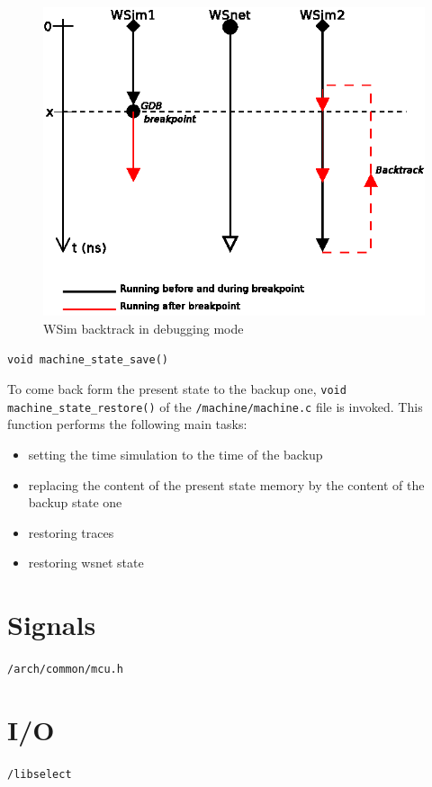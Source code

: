\documentclass[a4paper,10pt]{report}
\begin{document}
\begin{figure}
\begin{center}
  \includegraphics[scale=1]{figures/wsim_backtrack2.eps}
\end{center}
\caption{WSim backtrack in debugging mode}
\label{wsim backtrack 2}
\end{figure}

\verb$void machine_state_save()$

To come back form the present state to the backup one, \verb$void machine_state_restore()$ of the \verb$/machine/machine.c$ file is invoked. This function performs the following main tasks:
\begin{itemize}
  \item setting the time simulation to the time of the backup
  \item replacing the content of the present state memory by the content of the backup state one
  \item restoring traces
  \item restoring wsnet state
\end{itemize}

\section{Signals}
\verb$/arch/common/mcu.h$

\section{I/O}
\verb$/libselect$
\end{document}

